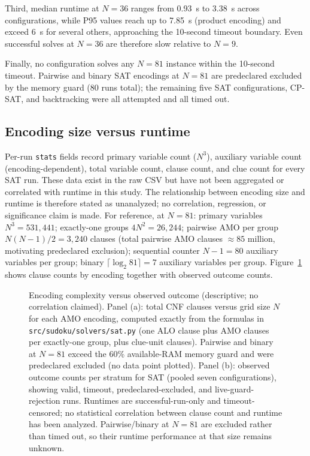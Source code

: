 \documentclass[a4paper,fleqn]{cas-sc}
\begin{document}
Third, median runtime at \(N=36\) ranges from 0.93~s to 3.38~s across configurations, while P95 values reach up to 7.85~s (product encoding) and exceed 6~s for several others, approaching the 10-second timeout boundary. Even successful solves at \(N=36\) are therefore slow relative to \(N=9\).

Finally, no configuration solves any \(N=81\) instance within the 10-second timeout. Pairwise and binary SAT encodings at \(N=81\) are predeclared excluded by the memory guard (80 runs total); the remaining five SAT configurations, CP-SAT, and backtracking were all attempted and all timed out.

\subsection{Encoding size versus runtime}\label{sec:encsize}

Per-run \texttt{stats} fields record primary variable count (\(N^3\)), auxiliary variable count (encoding-dependent), total variable count, clause count, and clue count for every SAT run. These data exist in the raw CSV but have not been aggregated or correlated with runtime in this study. The relationship between encoding size and runtime is therefore stated as unanalyzed; no correlation, regression, or significance claim is made. For reference, at \(N=81\): primary variables \(N^3 = 531{,}441\); exactly-one groups \(4N^2 = 26{,}244\); pairwise AMO per group \(N(N-1)/2 = 3{,}240\) clauses (total pairwise AMO clauses \(\approx 85\) million, motivating predeclared exclusion); sequential counter \(N-1=80\) auxiliary variables per group; binary \(\lceil\log_2 81\rceil=7\) auxiliary variables per group. Figure~\ref{fig:complexity} shows clause counts by encoding together with observed outcome counts.

\begin{figure}[htbp]
\centering

\caption{Encoding complexity versus observed outcome (descriptive; no correlation claimed). Panel (a): total CNF clauses versus grid size \(N\) for each AMO encoding, computed exactly from the formulas in \texttt{src/sudoku/solvers/sat.py} (one ALO clause plus AMO clauses per exactly-one group, plus clue-unit clauses). Pairwise and binary at \(N=81\) exceed the 60\% available-RAM memory guard and were predeclared excluded (no data point plotted). Panel (b): observed outcome counts per stratum for SAT (pooled seven configurations), showing valid, timeout, predeclared-excluded, and live-guard-rejection runs. Runtimes are successful-run-only and timeout-censored; no statistical correlation between clause count and runtime has been analyzed. Pairwise/binary at \(N=81\) are excluded rather than timed out, so their runtime performance at that size remains unknown.}
\label{fig:complexity}
\end{figure}
\end{document}
